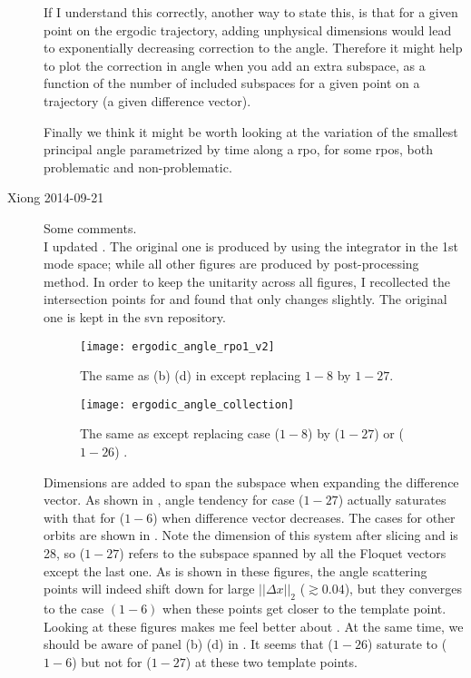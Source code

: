 \begin{description}
If I understand this correctly, another way to state this, is that for a given point on the ergodic trajectory,
adding unphysical dimensions would lead to exponentially decreasing correction to the angle. Therefore it might help to
plot the correction in angle when you add an extra subspace, as a function of the number of included subspaces for a given point on a trajectory (a given difference vector).

Finally we think it might be worth looking at the variation of the smallest principal angle parametrized by time along a
rpo, for some rpos, both problematic and non-problematic.

\item[Xiong 2014-09-21] Some comments. \\
I updated . The original one is produced by
using the integrator in the 1st mode space; while all other figures are produced by
post-processing method. In order to keep the unitarity across all figures, I recollected
the intersection points for  and found that  only changes slightly. The original one is kept in the
svn repository.

\begin{figure}[h]
  \centering
  \texttt{[image: ergodic\_angle\_rpo1\_v2]}
  \caption{The same as (b) (d) in 
    except replacing $1-8$ by $1-27$.}
  \label{fig:ergodic_angle_rpo1_v2}
\end{figure}

\begin{figure}[h]
  \centering
  \texttt{[image: ergodic\_angle\_collection]}
  \caption{The same as  except replacing case ($1-8$)
    by ($1-27$) or ($1-26$) .}
  \label{fig:ergodic_angle_collection}
\end{figure}

Dimensions are added to span the subspace when expanding the difference
vector. As shown in , angle tendency
for case ($1-27$) actually saturates with that for ($1-6$) when
difference vector decreases. The cases for other orbits are shown in
. Note the dimension of this
system after slicing and {\PoincSec} is 28, so ($1-27$) refers to the
subspace spanned by all the Floquet vectors except the last one. As is
shown in these figures, the angle scattering points will indeed shift
down for large $||\Delta x||_2$ ($\gtrsim 0.04$), but they converges to
the case $(1-6)$ when these points get closer to the template point.
Looking at these figures makes me feel better about
. At the same time, we should be
aware of panel (b) (d) in . It
seems that ($1-26$) saturate to ($1-6$) but not for ($1-27$) at these
two template points.


\end{description}
